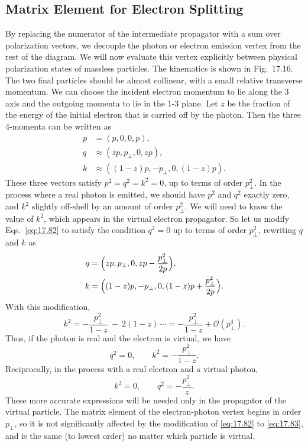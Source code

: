 \subsection{Matrix Element for Electron Splitting}

By replacing the numerator of the intermediate propagator with a sum over
polarization vectors, we decouple the photon or electron emission vertex from
the rest of the diagram.  We will now evaluate this vertex explicitly between
physical polarization states of massless particles.  The kinematics is shown
in Fig.~17.16.  The two final particles should be almost collinear,
with a small relative transverse momentum.  We can choose the incident
electron momentum to lie along the 3 axis and the outgoing momenta to lie in
the 1-3 plane.  Let $z$ be the fraction of the energy of the initial electron
that is carried off by the photon.  Then the three 4-momenta can be written as
\begin{equation}
  \begin{aligned}
    p &= (p, 0, 0, p),\\
    q &\approx (zp, p_\perp, 0, zp),\\
    k &\approx ((1-z)p, -p_\perp, 0, (1-z)p) .
  \end{aligned}
  \label{eq:17.82}
\end{equation}
These three vectors satisfy $p^2 = q^2 = k^2 = 0$, up to terms of order
$p_\perp^2$.  In the process where a real photon is emitted, we should have
$p^2$ and $q^2$ exactly zero, and $k^2$ slightly off-shell by an amount of
order $p_\perp^2$.  We will need to know the value of $k^2$, which appears in
the virtual electron propagator.  So let us modify Eqs.~\eqref{eq:17.82} to
satisfy the condition $q^2 = 0$ up to terms of order $p_\perp^2$, rewriting
$q$ and $k$ as
\begin{equation}
  \begin{aligned}
    q &= \Bigl( zp, p_\perp, 0, zp - \frac{p_\perp^2}{2p} \Bigr),\\
    k &= \Bigl( (1-z)p, -p_\perp, 0, (1-z)p + \frac{p_\perp^2}{2p}
      \Bigr) .
  \end{aligned}
  \label{eq:17.83}
\end{equation}
With this modification,
\begin{equation}
  k^2 = -\frac{p_\perp^2}{1-z}\ -\ 2(1-z)\,\cdots = -\frac{p_\perp^2}{1-z}
    + \mathcal{O}(p_\perp^4) .
  \label{eq:17.84}
\end{equation}
Thus, if the photon is real and the electron is virtual, we have
\begin{equation}
  q^2 = 0,\qquad k^2 = -\frac{p_\perp^2}{1-z} .
\end{equation}
Reciprocally, in the process with a real electron and a virtual photon,
\begin{equation}
  k^2 = 0,\qquad q^2 = -\frac{p_\perp^2}{z} .
  \label{eq:17.85}
\end{equation}
These more accurate expressions will be needed only in the propagator of the
virtual particle.  The matrix element of the electron-photon vertex begins in
order $p_\perp$, so it is not significantly affected by the modification of
\eqref{eq:17.82} to \eqref{eq:17.83}, and is the same (to lowest order) no
matter which particle is virtual.

